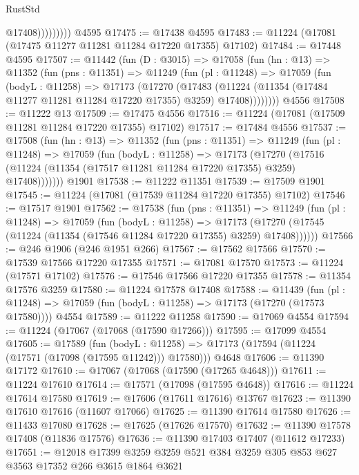 \begin{lexlean}{RustStd}
\begin{coremodule}
                      @17408)))))))))
    @4595
@17475 := @17438 @4595
@17483 := @11224 (@17081 (@17475 @11277 @11281 @11284 @17220 @17355) @17102)
@17484 := @17448 @4595
@17507 := @11442
    (fun (D : @3015) =>
    @17058
      (fun (hn : @13) =>
      @11352
        (fun (pns : @11351) =>
        @11249
          (fun (pl : @11248) =>
          @17059
            (fun (bodyL : @11258) =>
            @17173
              (@17270
                (@17483
                  (@11224 (@11354 (@17484 @11277 @11281 @11284 @17220 @17355) @3259) @17408))))))))
    @4556
@17508 := @11222 @13
@17509 := @17475 @4556
@17516 := @11224 (@17081 (@17509 @11281 @11284 @17220 @17355) @17102)
@17517 := @17484 @4556
@17537 := @17508
    (fun (hn : @13) =>
    @11352
      (fun (pns : @11351) =>
      @11249
        (fun (pl : @11248) =>
        @17059
          (fun (bodyL : @11258) =>
          @17173
            (@17270
              (@17516 (@11224 (@11354 (@17517 @11281 @11284 @17220 @17355) @3259) @17408)))))))
    @1901
@17538 := @11222 @11351
@17539 := @17509 @1901
@17545 := @11224 (@17081 (@17539 @11284 @17220 @17355) @17102)
@17546 := @17517 @1901
@17562 := @17538
    (fun (pns : @11351) =>
    @11249
      (fun (pl : @11248) =>
      @17059
        (fun (bodyL : @11258) =>
        @17173 (@17270 (@17545 (@11224 (@11354 (@17546 @11284 @17220 @17355) @3259) @17408))))))
@17566 := @246 @1906 (@246 @1951 @266)
@17567 := @17562 @17566
@17570 := @17539 @17566 @17220 @17355
@17571 := @17081 @17570
@17573 := @11224 (@17571 @17102)
@17576 := @17546 @17566 @17220 @17355
@17578 := @11354 @17576 @3259
@17580 := @11224 @17578 @17408
@17588 := @11439
    (fun (pl : @11248) => @17059 (fun (bodyL : @11258) => @17173 (@17270 (@17573 @17580))))
    @4554
@17589 := @11222 @11258
@17590 := @17069 @4554
@17594 := @11224 (@17067 (@17068 (@17590 @17266)))
@17595 := @17099 @4554
@17605 := @17589
    (fun (bodyL : @11258) => @17173 (@17594 (@11224 (@17571 (@17098 (@17595 @11242))) @17580)))
    @4648
@17606 := @11390 @17172
@17610 := @17067 (@17068 (@17590 (@17265 @4648)))
@17611 := @11224 @17610
@17614 := @17571 (@17098 (@17595 @4648))
@17616 := @11224 @17614 @17580
@17619 := @17606 (@17611 @17616) @13767
@17623 := @11390 @17610 @17616 (@11607 @17066)
@17625 := @11390 @17614 @17580
@17626 := @11433 @17080
@17628 := @17625 (@17626 @17570)
@17632 := @11390 @17578 @17408 (@11836 @17576)
@17636 := @11390 @17403 @17407 (@11612 @17233)
@17651 := @12018
    @17399
    @3259
    @3259
    @521
    @384
    @3259
    @305
    @853
    @627
    @3563
    @17352
    @266
    @3615
    @1864
    @3621

\end{coremodule}
\end{lexlean}
